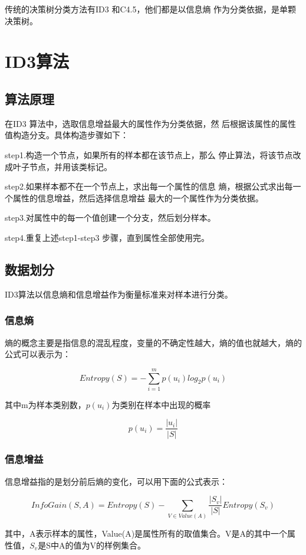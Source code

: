 \documentclass[11pt,a4paper]{article}
\begin{document}
传统的决策树分类方法有ID3 和C4.5，他们都是以信息熵
作为分类依据，是单颗决策树。

\section{ID3算法}

\subsection{算法原理}
在ID3 算法中，选取信息增益最大的属性作为分类依据，然
后根据该属性的属性值构造分支。具体构造步骤如下：

step1.构造一个节点，如果所有的样本都在该节点上，那么
停止算法，将该节点改成叶子节点，并用该类标记。

step2.如果样本都不在一个节点上，求出每一个属性的信息
熵，根据公式求出每一个属性的信息增益，然后选择信息增益
最大的一个属性作为分类依据。

step3.对属性中的每一个值创建一个分支，然后划分样本。

step4.重复上述step1-step3 步骤，直到属性全部使用完。\cite{r2}

\subsection{数据划分}

ID3算法以信息熵和信息增益作为衡量标准来对样本进行分类。

\subsubsection{信息熵}
 熵的概念主要是指信息的混乱程度，变量的不确定性越大，熵的值也就越大，熵的公式可以表示为：
 
$$Entropy(S) = -\sum_{i=1}^m p(u_i)log_2p(u_i)$$
 
其中m为样本类别数，$p(u_i)$为类别在样本中出现的概率

$$p(u_i) = \frac{|u_i|}{|S|}$$

\subsubsection{信息增益}

信息增益指的是划分前后熵的变化，可以用下面的公式表示：

$$InfoGain(S, A) =Entropy(S) -\sum_{V\in Value(A)}  \frac{|S_v|}{|S|} Entropy(S_v)$$

其中，A表示样本的属性，Value(A)是属性所有的取值集合。V是A的其中一个属性值，$S_v$是S中A的值为V的样例集合。\cite{r4}
\end{document}
